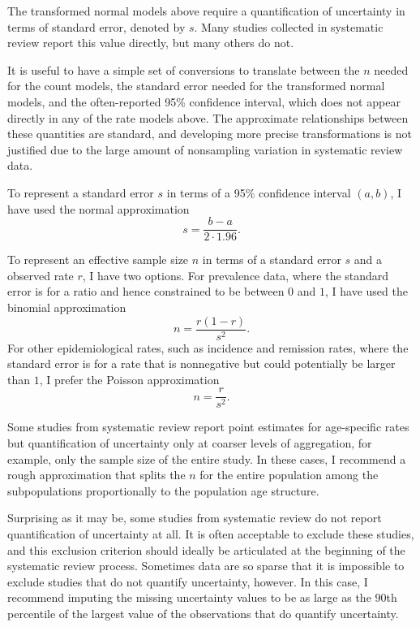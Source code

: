 The transformed normal models above require a quantification of
uncertainty in terms of standard error, denoted by $s$.  Many studies
collected in systematic review report this value directly, but many
others do not.

It is useful to have a simple set of conversions to translate between
the $n$ needed for the count models, the standard error needed for the
transformed normal models, and the often-reported 95\% confidence
interval, which does not appear directly in any of the rate models
above. The approximate relationships between these quantities are
standard, and developing more precise transformations is not justified
due to the large amount of nonsampling variation in systematic review
data.

To represent a standard error $s$ in terms of a 95\% confidence
interval $(a,b)$, I have used the normal approximation
\[
s = \frac{b-a}{2\cdot 1.96}.
\]

To represent an effective sample size $n$ in terms of a standard error
$s$ and a observed rate $r$, I have two options.  For prevalence data,
where the standard error is for a ratio and hence constrained to be
between $0$ and $1$, I have used the binomial approximation
\[
n = \frac{r(1-r)}{s^2}.
\]
For other epidemiological rates, such as incidence and remission
rates, where the standard error is for a rate that is nonnegative but
could potentially be larger than $1$, I prefer the Poisson
approximation
\[
n = \frac{r}{s^2}.
\]

Some studies from systematic review report point estimates for
age-specific rates but quantification of uncertainty only at coarser
levels of aggregation, for example, only the sample size of the entire
study.  In these cases, I recommend a rough approximation that splits
the $n$ for the entire population among the subpopulations
proportionally to the population age structure.

Surprising as it may be, some studies from systematic review do not
report quantification of uncertainty at all.  It is often acceptable
to exclude these studies, and this exclusion criterion should ideally
be articulated at the beginning of the systematic review process.
Sometimes data are so sparse that it is impossible to exclude studies
that do not quantify uncertainty, however.  In this case, I recommend
imputing the missing uncertainty values to be as large as the $90$th
percentile of the largest value of the observations that do quantify
uncertainty.



